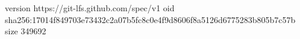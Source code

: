 version https://git-lfs.github.com/spec/v1
oid sha256:17014f849703e73432c2a07b5fc8c0e4f9d8606f8a5126d6775283b805b7c57b
size 349692
